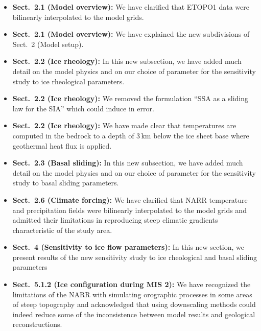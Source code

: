 \begin{itemize}

    \item \textbf{Sect.~2.1 (Model overview):}
    We have clarified that ETOPO1 data were bilinearly interpolated to the
    model grids.

    \item \textbf{Sect.~2.1 (Model overview):}
    We have explained the new subdivisions of Sect.~2 (Model setup).

    \item \textbf{Sect.~2.2 (Ice rheology):}
    In this new subsection, we have added much detail on the model physics and
    on our choice of parameter for the sensitivity study to ice rheological
    parameters.

    \item \textbf{Sect.~2.2 (Ice rheology):}
    We removed the formulation ``SSA as a sliding law for the SIA'' which could
    induce in error.

    \item \textbf{Sect.~2.2 (Ice rheology):}
    We have made clear that temperatures are computed in the bedrock to a depth
    of 3\,km below the ice sheet base where geothermal heat flux is applied.

    \item \textbf{Sect.~2.3 (Basal sliding):}
    In this new subsection, we have added much detail on the model physics and
    on our choice of parameter for the sensitivity study to basal sliding
    parameters.

    \item \textbf{Sect.~2.6 (Climate forcing):}
    We have clarified that NARR temperature and precipitation fields were
    bilinearly interpolated to the model grids and admitted their limitations
    in reproducing steep climatic gradients characteristic of the study area.

    \item \textbf{Sect.~4 (Sensitivity to ice flow parameters):}
    In this new section, we present results of the new sensitivity study to ice
    rheological and basal sliding parameters

    \item \textbf{Sect.~5.1.2 (Ice configuration during MIS 2):}
    We have recognized the limitations of the NARR with simulating orographic
    processes in some areas of steep topography and acknowledged that using
    downscaling methods could indeed reduce some of the inconsistence between
    model results and geological reconstructions.


\end{itemize}
